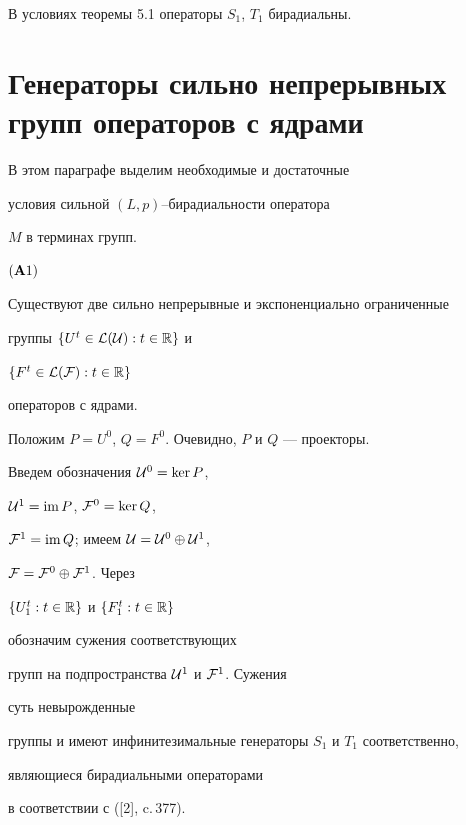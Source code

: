 \begin{cors}


В условиях теоремы 5.1 операторы $S_1$, $T_1$ бирадиальны.


\end{cors}





\section{Генераторы сильно непрерывных групп операторов с ядрами}





В этом параграфе выделим необходимые и достаточные


условия сильной $(L,p)$--би\-ра\-ди\-аль\-но\-сти оператора


$M$ в терминах групп.





$({\bold A1})$  {\it


Существуют две сильно непрерывные и экспоненциально ограниченные


группы $\{ U^t\in {\cal L(\cal U)}:t\in {\Bbb R} \}$ и


$\{F^t\in {\cal L(\cal F)}:t\in {\Bbb R}\}$


операторов с ядрами.}





Положим $P=U^0$, $Q=F^0$. Очевидно, $P$ и $Q$ --- проекторы.


Введем обозначения ${\cal U}^0=\ker P$,


${\cal U}^1=\operatorname{im} P$, ${\cal F}^0=\ker Q$,


${\cal F}^1=\operatorname{im} Q$; имеем ${\cal U}={\cal U}^0\oplus {\cal U}^1$,


${\cal F}={\cal F}^0\oplus {\cal F}^1$. Через


$\{ U^t_1:t\in {\Bbb R} \}$ и $\{ F^t_1:t\in {\Bbb R} \}$


обозначим сужения соответствующих


групп на подпространства ${\cal U}^1$ и ${\cal F}^1$. Сужения


суть невырожденные


группы и имеют инфинитезимальные генераторы $S_1$ и $T_1$ соответственно,


являющиеся  бирадиальными операторами


в соответствии с ([2], c.\,377).





